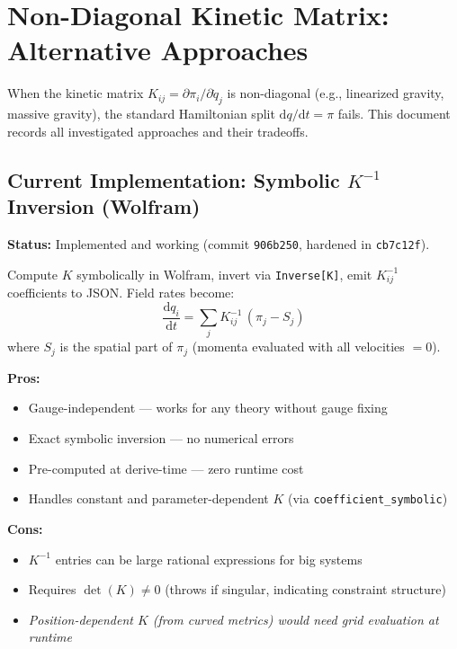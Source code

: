 
\section{Non-Diagonal Kinetic Matrix: Alternative Approaches}
\label{sec:kinetic-matrix}

When the kinetic matrix $K_{ij} = \partial \pi_i / \partial \dot{q}_j$ is non-diagonal (e.g., linearized gravity, massive gravity), the standard Hamiltonian split $\mathrm{d}q/\mathrm{d}t = \pi$ fails. This document records all investigated approaches and their tradeoffs.


\subsection{Current Implementation: Symbolic $K^{-1}$ Inversion (Wolfram)}
\label{sec:kinetic-current}

\textbf{Status:} Implemented and working (commit \texttt{906b250}, hardened in \texttt{cb7c12f}).

Compute $K$ symbolically in Wolfram, invert via \texttt{Inverse[K]}, emit $K^{-1}_{ij}$ coefficients to JSON. Field rates become:
\begin{equation}
  \frac{\mathrm{d}q_i}{\mathrm{d}t} = \sum_j K^{-1}_{ij}\, (\pi_j - S_j)
  \label{eq:kinv-field-rates}
\end{equation}
where $S_j$ is the spatial part of $\pi_j$ (momenta evaluated with all velocities $= 0$).

\textbf{Pros:}
\begin{itemize}
  \item Gauge-independent --- works for any theory without gauge fixing
  \item Exact symbolic inversion --- no numerical errors
  \item Pre-computed at derive-time --- zero runtime cost
  \item Handles constant and parameter-dependent $K$ (via \texttt{coefficient\_symbolic})
\end{itemize}

\textbf{Cons:}
\begin{itemize}
  \item $K^{-1}$ entries can be large rational expressions for big systems
  \item Requires $\det(K) \neq 0$ (throws if singular, indicating constraint structure)
  \item \emph{Position-dependent $K$ (from curved metrics) would need grid evaluation at runtime}
\end{itemize}

